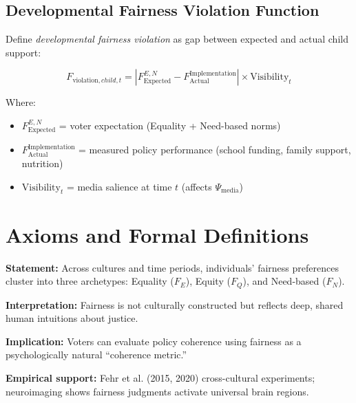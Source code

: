 \subsection{Developmental Fairness Violation Function}

Define \textit{developmental fairness violation} as gap between expected and actual child support:

\begin{equation}
F_{\text{violation},child,t} = |F_{\text{Expected}}^{E,N} - F_{\text{Actual}}^{\text{Implementation}}| \times \text{Visibility}_{t}
\end{equation}

Where:
\begin{itemize}[nosep]
\item $F_{\text{Expected}}^{E,N}$ = voter expectation (Equality + Need-based norms)
\item $F_{\text{Actual}}^{\text{Implementation}}$ = measured policy performance (school funding, family support, nutrition)
\item $\text{Visibility}_{t}$ = media salience at time $t$ (affects $\Psi_{\text{media}}$)
\end{itemize}

\section{Axioms and Formal Definitions}
\label{sec:cm-axioms}

\begin{tcolorbox}[colback=gray!5!white, colframe=gray!75!black,
    title=Axiom CM-1: Fairness Archetypes are Universal]

\textbf{Statement:} Across cultures and time periods, individuals' fairness preferences cluster
into three archetypes: Equality ($F_E$), Equity ($F_Q$), and Need-based ($F_N$).

\textbf{Interpretation:} Fairness is not culturally constructed but reflects deep, shared
human intuitions about justice.

\textbf{Implication:} Voters can evaluate policy coherence using fairness as a psychologically
natural ``coherence metric.''

\textbf{Empirical support:} Fehr et al. (2015, 2020) cross-cultural experiments; neuroimaging
shows fairness judgments activate universal brain regions.

\end{tcolorbox}

